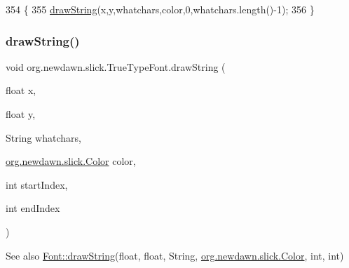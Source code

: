 \begin{DoxyCode}
354                                            \{
355         \mbox{\hyperlink{classorg_1_1newdawn_1_1slick_1_1_true_type_font_a348f5304a388040ffe1d87b2f17487de}{drawString}}(x,y,whatchars,color,0,whatchars.length()-1);
356     \}
\end{DoxyCode}
\mbox{\label{classorg_1_1newdawn_1_1slick_1_1_true_type_font_a6b7a0c70c011517ac5dc2bc498516120}} 
\subsubsection{\texorpdfstring{draw\+String()}{drawString()}\hspace{0.1cm}{\footnotesize\ttfamily [2/3]}}
{\footnotesize\ttfamily void org.\+newdawn.\+slick.\+True\+Type\+Font.\+draw\+String (\begin{DoxyParamCaption}\item[{float}]{x,  }\item[{float}]{y,  }\item[{String}]{whatchars,  }\item[{\mbox{\hyperlink{classorg_1_1newdawn_1_1slick_1_1_color}{org.\+newdawn.\+slick.\+Color}}}]{color,  }\item[{int}]{start\+Index,  }\item[{int}]{end\+Index }\end{DoxyParamCaption})\hspace{0.3cm}{\ttfamily [inline]}}

\begin{DoxySeeAlso}{See also}
\mbox{\hyperlink{interfaceorg_1_1newdawn_1_1slick_1_1_font_a40b19381efcb64ce1ce4d446eff1e350}{Font\+::draw\+String}}(float, float, String, \mbox{\hyperlink{classorg_1_1newdawn_1_1slick_1_1_color}{org.\+newdawn.\+slick.\+Color}}, int, int) 
\end{DoxySeeAlso}

